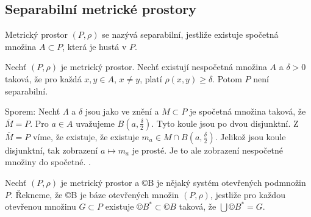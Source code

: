 \documentclass[12pt]{article}					%
\begin{document}
	\subsection{Separabilní metrické prostory}
	\begin{definice}
		Metrický prostor $(P, \rho)$ se nazývá separabilní, jestliže existuje spočetná množina $A \subset P$, která je hustá v $P$.
	\end{definice}

	\begin{veta}
		Nechť $(P, \rho)$ je metrický prostor. Nechť existují nespočetná množina $A$ a $\delta > 0$ taková, že pro každá $x, y \in A$, $x ≠ y$, platí $\rho(x, y) ≥ \delta$. Potom $P$ není separabilní.

		\begin{dukazin}
			Sporem: Nechť $\Lambda$ a $\delta$ jsou jako ve znění a $M \subset P$ je spočetná množina taková, že $\overline{M} = P$. Pro $a \in A$ uvažujeme $B(a, \frac{\delta}{2})$. Tyto koule jsou po dvou disjunktní. Z $\overline{M} = P$ víme, že existuje, že existuje $m_a \in M \cap B(a, \frac{\delta}{2})$. Jelikož jsou koule disjunktní, tak zobrazení $a \mapsto m_a$ je prosté. Je to ale zobrazení nespočetné množiny do spočetné. \lightning.
		\end{dukazin}
	\end{veta}

	\begin{definice}
		Nechť $(P, \rho)$ je metrický prostor a ©B je nějaký systém otevřených podmnožin $P$. Řekneme, že ©B je báze otevřených množin $(P, \rho)$, jestliže pro každou otevřenou množinu $G \subset P$ existuje $©B^* \subset ©B$ taková, že $\bigcup ©B^* = G$.
	\end{definice}
\end{document}
